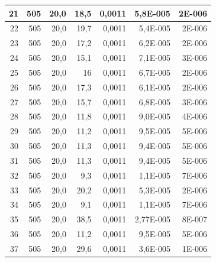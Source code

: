 \documentclass[12pt]{scrartcl}
\begin{document}
\begin{table}[H]
\begin{center}
\begin{tabular}{|r|r|r|r|r|r|r|}
21 & 505 & 20,0 & 18,5 & 0,0011  & 5,8E-005 & 2E-006 \\ \hline
22 & 505 & 20,0 & 19,7 & 0,0011  & 5,4E-005 & 2E-006 \\ \hline
23 & 505 & 20,0 & 17,2 & 0,0011  & 6,2E-005 & 2E-006 \\ \hline
24 & 505 & 20,0 & 15,1 & 0,0011  & 7,1E-005 & 3E-006 \\ \hline
25 & 505 & 20,0 & 16 & 0,0011  & 6,7E-005 & 2E-006 \\ \hline
26 & 505 & 20,0 & 17,3 & 0,0011  & 6,1E-005 & 2E-006 \\ \hline
27  & 505 & 20,0 & 15,7 & 0,0011  & 6,8E-005 & 3E-006 \\ \hline
28 & 505 & 20,0 & 11,8 & 0,0011  & 9,0E-005 & 4E-006 \\ \hline
29 & 505 & 20,0 & 11,2 & 0,0011  & 9,5E-005 & 5E-006 \\ \hline
30 & 505 & 20,0 & 11,3 & 0,0011  & 9,4E-005 & 5E-006 \\ \hline
31 & 505 & 20,0 & 11,3 & 0,0011  & 9,4E-005 & 5E-006 \\ \hline
32 & 505 & 20,0 & 9,3 & 0,0011  & 1,1E-005 & 7E-006 \\ \hline
33 & 505 & 20,0 & 20,2 & 0,0011  & 5,3E-005 & 2E-006 \\ \hline
34 & 505 & 20,0 & 9,1 & 0,0011  & 1,1E-005 & 7E-006 \\ \hline
35 & 505 & 20,0 & 38,5 & 0,0011  & 2,77E-005 & 8E-007 \\ \hline
36 & 505 & 20,0 & 11,2 & 0,0011  & 9,5E-005 & 5E-006 \\ \hline
37 & 505 & 20,0 & 29,6 & 0,0011  & 3,6E-005 & 1E-006 \\ \hline
\end{tabular}
\end{center}
\label{tab:messwerte_1}
\end{table}
\end{document}
